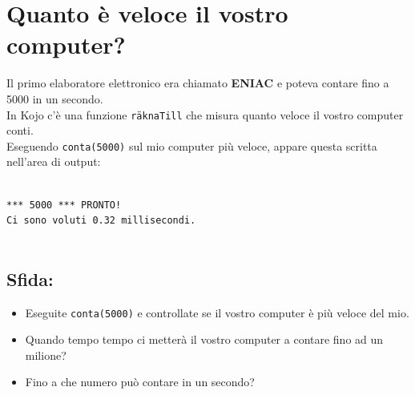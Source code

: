 \chapter{Quanto è veloce il vostro computer?}Il primo elaboratore elettronico era chiamato {\bf ENIAC} e poteva contare fino a 5000 in un secondo.\\
In Kojo c'è una funzione  \lstinline{räknaTill} che misura quanto veloce il vostro computer conti.\\
Eseguendo \lstinline{conta(5000)} sul mio computer più veloce, appare questa scritta nell'area di output:

\begin{lstlisting}[numbers=none]

*** 5000 *** PRONTO!
Ci sono voluti 0.32 millisecondi.
      
\end{lstlisting}
        
\section*{\color{BrickRed}Sfida:}


\begin{itemize}

\item {Eseguite \lstinline{conta(5000)} e controllate se il vostro computer è più veloce del mio.}
\item {Quando tempo tempo ci metterà il vostro computer a contare fino ad un milione?}
\item {Fino a che numero può contare in un secondo?}

\end{itemize}


